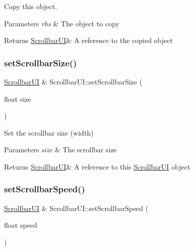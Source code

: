 Copy this object. 


\begin{DoxyParams}{Parameters}
{\em rhs} & The object to copy \\
\hline
\end{DoxyParams}
\begin{DoxyReturn}{Returns}
\hyperlink{class_scrollbar_u_i}{Scrollbar\+UI}\& A reference to the copied object 
\end{DoxyReturn}
\mbox{\label{class_scrollbar_u_i_ae42a6691cc86a27ffdf5491976cf5eb1}} 
\subsubsection{\texorpdfstring{set\+Scrollbar\+Size()}{setScrollbarSize()}}
{\footnotesize\ttfamily \hyperlink{class_scrollbar_u_i}{Scrollbar\+UI} \& Scrollbar\+U\+I\+::set\+Scrollbar\+Size (\begin{DoxyParamCaption}\item[{float}]{size }\end{DoxyParamCaption})}



Set the scrollbar size (width) 


\begin{DoxyParams}{Parameters}
{\em size} & The scrollbar size \\
\hline
\end{DoxyParams}
\begin{DoxyReturn}{Returns}
\hyperlink{class_scrollbar_u_i}{Scrollbar\+UI}\& A reference to \textquotesingle{}this\textquotesingle{} \hyperlink{class_scrollbar_u_i}{Scrollbar\+UI} object 
\end{DoxyReturn}
\mbox{\label{class_scrollbar_u_i_a4106fe5566d4041d348e14025fc12b4a}} 
\subsubsection{\texorpdfstring{set\+Scrollbar\+Speed()}{setScrollbarSpeed()}}
{\footnotesize\ttfamily \hyperlink{class_scrollbar_u_i}{Scrollbar\+UI} \& Scrollbar\+U\+I\+::set\+Scrollbar\+Speed (\begin{DoxyParamCaption}\item[{float}]{speed }\end{DoxyParamCaption})}



